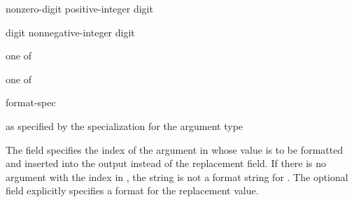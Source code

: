 \begin{ncbnf}
\br
    nonzero-digit\br
    positive-integer digit
\end{ncbnf}

\begin{ncbnf}
\br
    digit\br
    nonnegative-integer digit
\end{ncbnf}

\begin{ncbnf}
 \textnormal{one of}\br
\end{ncbnf}

\begin{ncbnf}
 \textnormal{one of}\br
\end{ncbnf}

\begin{ncbnf}
\br
    \terminal{:} format-spec
\end{ncbnf}

\begin{ncbnf}
\br
    \textnormal{as specified by the  specialization for the argument type}
\end{ncbnf}

\pnum
The  field specifies the index of
the argument in 
whose value is to be formatted and inserted into the output
instead of the replacement field.
If there is no argument with
the index  in ,
the string is not a format string for .
The optional  field
explicitly specifies a format for the replacement value.

\pnum
\begin{example}
\begin{codeblock}
string s = format("{0}-{{", 8);         // value of  is 
\end{codeblock}
\end{example}

